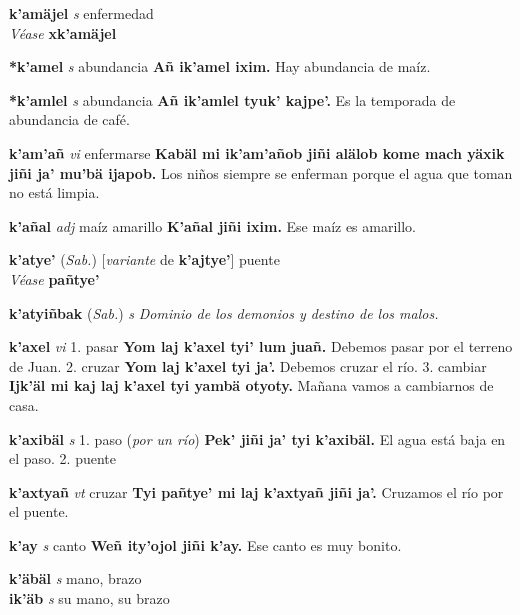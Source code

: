 \documentclass[10pt]{scrbook}
\newcommand{\entry}[1]{\textbf{#1}}
\newcommand{\onedefinition}[1]{#1.}
\newcommand{\nontranslationdef}[1]{\textit{#1}}
\newcommand{\partofspeech}[1]{\textit{#1}}
\newcommand{\spanishtranslation}[1]{#1}
\newcommand{\clarification}[1]{(\textit{#1})}
\newcommand{\cholexample}[1]{\textbf{#1}}
\newcommand{\exampletranslation}[1]{#1}
\newcommand{\alsosee}[1]{\\\textit{Véase} \textbf{#1}}
\newcommand{\relevantdialect}[1]{(\textit{#1})}
\newcommand{\secondaryentry}[1]{\\\textbf{#1}}
\newcommand{\secondpartofspeech}[1]{\textit{#1}}
\newcommand{\secondtranslation}[1]{#1}
\newcommand{\conjugationtense}[1]{[\textit{#1}}
\newcommand{\conjugationverb}[1]{de \textbf{#1}]}
\begin{document}
\begin{multicols}{2}
\entry{k'amäjel}
\partofspeech{s}
\spanishtranslation{enfermedad}
\alsosee{xk'amäjel}

\entry{*k'amel}
\partofspeech{s}
\spanishtranslation{abundancia}
\cholexample{Añ ik'amel ixim.}
\exampletranslation{Hay abundancia de maíz.}

\entry{*k'amlel}
\partofspeech{s}
\spanishtranslation{abundancia}
\cholexample{Añ ik'amlel tyuk' kajpe'.}
\exampletranslation{Es la temporada de abundancia de café.}

\entry{k'am'añ}
\partofspeech{vi}
\spanishtranslation{enfermarse}
\cholexample{Kabäl mi ik'am'añob jiñi alälob kome mach yäxik jiñi ja' mu'bä ijapob.}
\exampletranslation{Los niños siempre se enferman porque el agua que toman no está limpia.}

\entry{k'añal}
\partofspeech{adj}
\spanishtranslation{maíz amarillo}
\cholexample{K'añal jiñi ixim.}
\exampletranslation{Ese maíz es amarillo.}

\entry{k'atye'}
\relevantdialect{Sab.}
\conjugationtense{variante}
\conjugationverb{k'ajtye'}
\spanishtranslation{puente}
\alsosee{pañtye'}

\entry{k'atyiñbak}
\relevantdialect{Sab.}
\partofspeech{s}
\nontranslationdef{Dominio de los demonios y destino de los malos.}

\entry{k'axel}
\partofspeech{vi}
\onedefinition{1}
\spanishtranslation{pasar}
\cholexample{Yom laj k'axel tyi' lum juañ.}
\exampletranslation{Debemos pasar por el terreno de Juan.}
\onedefinition{2}
\spanishtranslation{cruzar}
\cholexample{Yom laj k'axel tyi ja'.}
\exampletranslation{Debemos cruzar el río.}
\onedefinition{3}
\spanishtranslation{cambiar}
\cholexample{Ijk'äl mi kaj laj k'axel tyi yambä otyoty.}
\exampletranslation{Mañana vamos a cambiarnos de casa.}

\entry{k'axibäl}
\partofspeech{s}
\onedefinition{1}
\spanishtranslation{paso}
\clarification{por un río}
\cholexample{Pek' jiñi ja' tyi k'axibäl.}
\exampletranslation{El agua está baja en el paso.}
\onedefinition{2}
\spanishtranslation{puente}

\entry{k'axtyañ}
\partofspeech{vt}
\spanishtranslation{cruzar}
\cholexample{Tyi pañtye' mi laj k'axtyañ jiñi ja'.}
\exampletranslation{Cruzamos el río por el puente.}

\entry{k'ay}
\partofspeech{s}
\spanishtranslation{canto}
\cholexample{Weñ ity'ojol jiñi k'ay.}
\exampletranslation{Ese canto es muy bonito.}

\entry{k'äbäl}
\partofspeech{s}
\spanishtranslation{mano, brazo}
\secondaryentry{ik'äb}
\secondpartofspeech{s}
\secondtranslation{su mano, su brazo}


\end{multicols}
\end{document}
